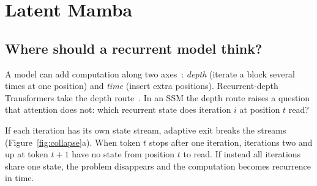 \documentclass[10pt]{article}
\begin{document}
\section{Latent Mamba}

\subsection{Where should a recurrent model think?}

A model can add computation along two axes~\cite{zhu2025survey,aviss2026sst}: \emph{depth} (iterate a block several times at one position) and \emph{time} (insert extra positions). Recurrent-depth Transformers take the depth route~\cite{geiping2025recurrent}. In an SSM the depth route raises a question that attention does not: which recurrent state does iteration $i$ at position $t$ read?

If each iteration has its own state stream, adaptive exit breaks the streams (Figure~\ref{fig:collapse}a). When token $t$ stops after one iteration, iterations two and up at token $t{+}1$ have no state from position $t$ to read. If instead all iterations share one state, the problem disappears and the computation becomes recurrence in time.
\end{document}
